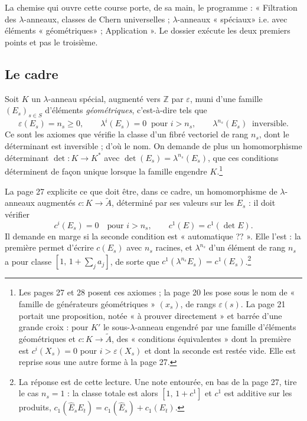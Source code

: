 \documentclass[11pt,a4paper]{article}
\begin{document}
La chemise qui ouvre cette course porte, de sa main, le programme : « Filtration
des $\lambda$-anneaux, classes de Chern universelles ; $\lambda$-anneaux
« spéciaux» i.e. avec éléments
« géométriques» ; Application ». Le dossier
exécute les deux premiers points et pas le troisième.

\subsection*{Le cadre}

Soit $K$ un $\lambda$-anneau spécial, augmenté vers $\mathbb{Z}$ par
$\varepsilon$, muni d'une famille $(E_{s})_{s \in S}$ d'éléments
\emph{géométriques}, c'est-à-dire tels que
\[
  \varepsilon(E_{s}) = n_{s} \geqslant 0, \qquad
  \lambda^{i}(E_{s}) = 0 \ \text{ pour } i > n_{s}, \qquad
  \lambda^{n_{s}}(E_{s}) \ \text{ inversible.}
\]
Ce sont les axiomes que vérifie la classe d'un fibré vectoriel de rang $n_{s}$,
dont le déterminant est inversible ; d'où le nom. On demande de plus un
homomorphisme déterminant $\det : K \to K^{*}$ avec $\det(E_{s}) =
\lambda^{n_{s}}(E_{s})$, que ces conditions déterminent de façon unique
lorsque la famille engendre $K$.\footnote{Les pages 27 et 28 posent ces
axiomes ; la page 20 les pose sous le nom de « famille de générateurs
géométriques » $(x_{s})$, de rangs $\varepsilon(s)$. La page 21 portait une
proposition, notée « à prouver directement » et barrée d'une grande croix :
pour $K'$ le sous-$\lambda$-anneau engendré par une famille d'éléments
géométriques et $c : K \to \widetilde{A}$, des « conditions équivalentes »
dont la première est $c^{i}(X_{s}) = 0$ pour $i > \varepsilon(X_{s})$ et dont la
seconde est restée vide. Elle est reprise sous une autre forme à la page 27.}

La page 27 explicite ce que doit être, dans ce cadre, un homomorphisme de
$\lambda$-anneaux augmentés $c : K \to \widetilde{A}$, déterminé par ses
valeurs sur les $E_{s}$ : il doit vérifier
\[
  c^{i}(E_{s}) = 0 \quad \text{pour } i > n_{s},
  \qquad
  c^{1}(E) = c^{1}(\det E) .
\]
Il demande en marge si la seconde condition est « automatique ?? ». Elle
l'est : la première permet d'écrire $c(E_{s})$ avec $n_{s}$ racines, et
$\lambda^{n_{s}}$ d'un élément de rang $n_{s}$ a pour classe
$[1,\, 1 + \sum_{j} a_{j}]$, de sorte que $c^{1}(\lambda^{n_{s}}E_{s}) =
c^{1}(E_{s})$.\footnote{La réponse est de cette lecture. Une note entourée, en
bas de la page 27, tire le cas $n_{s} = 1$ : la classe totale est alors
$[1,\, 1 + c^{1}]$ et $c^{1}$ est additive sur les produits,
$c_{1}(\widehat{E}_{s}E_{t}) = c_{1}(\widehat{E}_{s}) + c_{1}(E_{t})$.}
\end{document}
